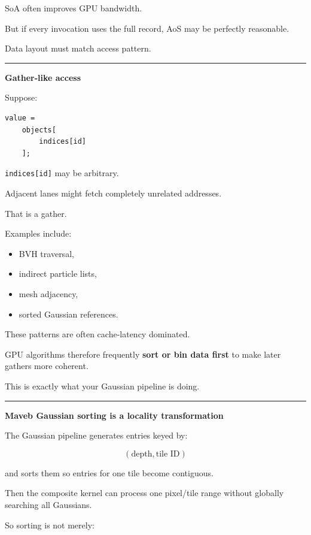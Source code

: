 SoA often improves GPU bandwidth.

But if every invocation uses the full record, AoS may be perfectly reasonable.

Data layout must match access pattern.

\begin{center}\rule{0.5\linewidth}{0.5pt}\end{center}

\textbf{Gather-like access}

Suppose:

\protect{}\label{yx7r08}%
\begin{verbatim}
value =
    objects[
        indices[id]
    ];
\end{verbatim}

\texttt{indices{[}id{]}} may be arbitrary.

Adjacent lanes might fetch completely unrelated addresses.

That is a gather.

Examples include:

\begin{itemize}
\tightlist
\item
  BVH traversal,
\item
  indirect particle lists,
\item
  mesh adjacency,
\item
  sorted Gaussian references.
\end{itemize}

These patterns are often cache-latency dominated.

GPU algorithms therefore frequently \textbf{sort or bin data first} to make later gathers more coherent.

This is exactly what your Gaussian pipeline is doing.

\begin{center}\rule{0.5\linewidth}{0.5pt}\end{center}

\textbf{Maveb Gaussian sorting is a locality transformation}

The Gaussian pipeline generates entries keyed by:

\[
(\text{depth},\text{tile ID})
\]

and sorts them so entries for one tile become contiguous.

Then the composite kernel can process one pixel/tile range without globally searching all Gaussians.

So sorting is not merely:

